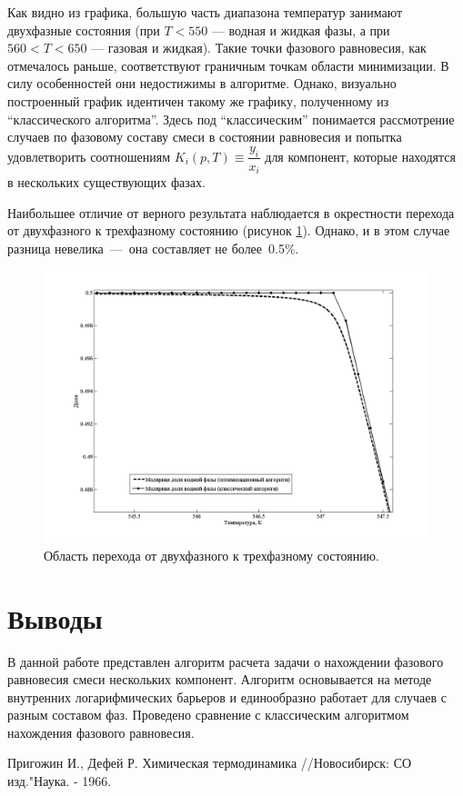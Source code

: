 \documentclass[12pt]{article}
\begin{document}
Как видно из графика, большую часть диапазона температур занимают двухфазные состояния (при $T<550$ --- водная и жидкая фазы, а при $560<T<650$ --- газовая и жидкая). Такие точки фазового равновесия, как отмечалось раньше, соответствуют граничным точкам области минимизации. В силу особенностей они недостижимы в алгоритме. Однако, визуально построенный график идентичен такому же графику, полученному из ``классического алгоритма''. Здесь под ``классическим'' понимается рассмотрение случаев по фазовому составу смеси в состоянии равновесия и попытка удовлетворить соотношениям $K_i(p,T) \equiv \dfrac{y_i}{x_i}$ для компонент, которые находятся в нескольких существующих фазах.

Наибольшее отличие от верного результата наблюдается в окрестности перехода от двухфазного к трехфазному состоянию (рисунок \ref{fig:2}). Однако, и в этом случае разница невелика~---~она составляет не более~0.5\%.

\begin{figure}
	\centering
	\includegraphics[width=\textwidth]{Figure2.png}
	\caption{Область перехода от двухфазного к трехфазному состоянию.}
	\label{fig:2}
\end{figure}

\section{Выводы}
В данной работе представлен алгоритм расчета задачи о нахождении фазового равновесия смеси нескольких компонент. Алгоритм основывается на методе внутренних логарифмических барьеров и единообразно работает для случаев с разным составом фаз. Проведено сравнение с классическим алгоритмом нахождения фазового равновесия.


\begin{thebibliography}{9}
     Пригожин И., Дефей Р. Химическая термодинамика //Новосибирск: СО изд."Наука. - 1966.
\end{thebibliography}
\end{document}
